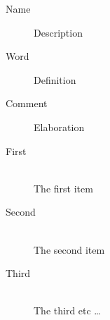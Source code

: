 \begin{description}
\item[Name] Description
\item[Word] Definition
\item[Comment] Elaboration
\end{description}


\begin{description}
  \item[First] \hfill \\
  The first item
  \item[Second] \hfill \\
  The second item
  \item[Third] \hfill \\
  The third etc \ldots
\end{description}



